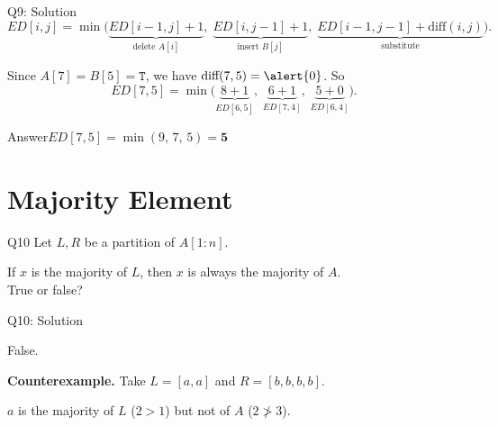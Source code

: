 \documentclass[10pt,aspectratio=169]{beamer}
\newcommand{\answer}[1]{\begin{alertblock}{Answer}#1\end{alertblock}}
\begin{document}
\begin{frame}{Q9: Solution}
  \[
    ED[i,j] = \min\big(
      \underbrace{ED[i-1,j] + 1}_{\text{delete } A[i]},\;
      \underbrace{ED[i,j-1] + 1}_{\text{insert } B[j]},\;
      \underbrace{ED[i-1,j-1] + \text{diff}(i,j)}_{\text{substitute}} \big).
  \]

  \bigskip
  Since $A[7] = B[5] = \texttt{T}$, we have $\text{diff}(7,5) = \alert{0}$.
  So
  \[
    ED[7,5] = \min\big( \underbrace{8+1}_{ED[6,5]},\;
                        \underbrace{6+1}_{ED[7,4]},\;
                        \underbrace{5+0}_{ED[6,4]} \big).
  \]

  \answer{$ED[7,5] = \min(9,\, 7,\, 5) = \mathbf{5}$}
\end{frame}

\section{Majority Element}

\begin{frame}{Q10}
  Let $L, R$ be a partition of $A[1:n]$.

  \bigskip
  \begin{center}
    \Large
    If $x$ is the majority of $L$, then $x$ is always the majority of $A$.\\[0.6em]
    True or false?
  \end{center}
\end{frame}

\begin{frame}{Q10: Solution}
  \begin{center}
    \alert{\Large False.}
  \end{center}

  \bigskip
  \textbf{Counterexample.} Take $L = [a, a]$ and $R = [b, b, b, b]$.

  \begin{center}
  \end{center}

  \bigskip
  $a$ is the majority of $L$ \;($2 > 1$)\; but not of $A$ \;($2 \not> 3$).
\end{frame}
\end{document}
